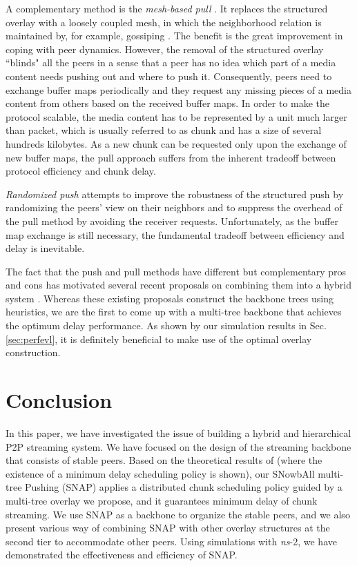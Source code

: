 \documentclass[conference]{IEEEtran}
\begin{document}
  A complementary method is the \textit{mesh-based pull} \cite{KosticRAV-SOSP03,ZhangLLY-INFOCOM05,MaghareiR-INFOCOM07,HeiLR-IEEECOMMAG08,LiXQKLLZ-INFOCOM08,FengLL-INFOCOM09}. It replaces the structured overlay with a loosely coupled mesh, in which the neighborhood relation is maintained by, for example, gossiping \cite{KosticRAV-SOSP03,ZhangLLY-INFOCOM05}. The benefit is the great improvement in coping with peer dynamics. However, the removal of the structured overlay ``blinds" all the peers in a sense that a peer has no idea which part of a media content needs pushing out and where to push it. Consequently, peers need to exchange buffer maps periodically and they request any missing pieces of a media content from others based on the received buffer maps. In order to make the protocol scalable, the media content has to be represented by a unit much larger than packet, which is usually referred to as chunk and has a size of several hundreds kilobytes. As a new chunk can be requested only upon the exchange of new buffer maps, the pull approach suffers from the inherent tradeoff between protocol efficiency and chunk delay.

  \textit{Randomized push} \cite{MassoulieTGR-INFOCOM07,BonaldMMPT-SIGMETRICS08} attempts to improve the robustness of the structured push by randomizing the peers' view on their neighbors and to suppress the overhead of the pull method by avoiding the receiver requests. Unfortunately, as the buffer map exchange is still necessary, the fundamental tradeoff between efficiency and delay is inevitable.

  The fact that the push and pull methods have different but complementary pros and cons has motivated several recent proposals on combining them into a hybrid system \cite{WangXL-ICDCS07,ZhangZSY-IEEEJSAC07,WangLX-INFOCOM08}. Whereas these existing proposals construct the backbone trees using heuristics, we are the first to come up with a multi-tree backbone that achieves the optimum delay performance. As shown by our simulation results in Sec.\ref{sec:perfevl}, it is definitely beneficial to make use of the optimal overlay construction.

\section{Conclusion} \label{sec:con}
In this paper, we have investigated the issue of building a hybrid and hierarchical P2P streaming system. We have focused on the design of the streaming backbone that consists of stable peers. Based on the theoretical results of \cite{Liu-MM07} (where the existence of a minimum delay scheduling policy is shown), our SNowbAll multi-tree Pushing (SNAP) applies a distributed chunk scheduling policy guided by a multi-tree overlay we propose, and it guarantees minimum delay of chunk streaming. We use SNAP as a backbone to organize the stable peers, and we also present various way of combining SNAP with other overlay structures at the second tier to accommodate other peers. Using simulations with \textit{ns}-2, we have demonstrated the effectiveness and efficiency of SNAP.
\end{document}
